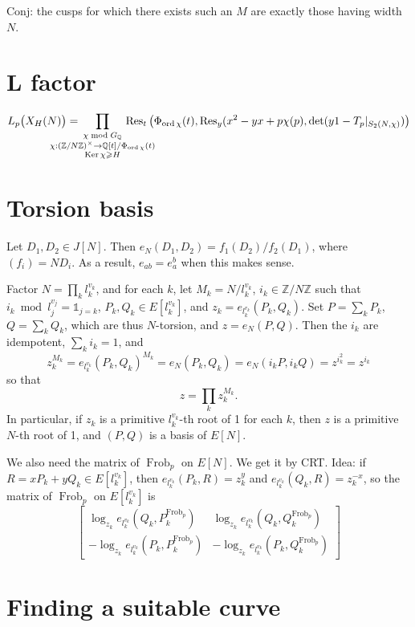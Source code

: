 \documentclass[12pt]{article}
\newcommand{\Z}{\mathbb{Z}}
\newcommand{\Q}{\mathbb{Q}}
\newcommand{\Ker}{\operatorname{Ker}}
\newcommand{\Res}{\operatorname{Res}}
\newcommand{\ord}{\operatorname{ord}}
\newcommand{\Frob}{\operatorname{Frob}}
\theoremstyle{definition}
\begin{document}
Conj: the cusps for which there exists such an $M$ are exactly those having width $N$.

\section{L factor}

\[ L_p\big(X_H(N)\big) = \hspace{-1cm} \prod_{\substack{\chi \bmod G_\Q \\ \chi : (\Z/N\Z)^\times \rightarrow \Q[t]/\Phi_{\ord \chi}(t) \\ \Ker \chi \geqslant H}} \hspace{-1cm} \Res_t\big( \Phi_{\ord \chi}(t),\Res_y(x^2-yx+p\chi(p), \det(y1-T_p \vert_{S_2(N,\chi)}) \big) \]

\section{Torsion basis}

Let $D_1, D_2 \in J[N]$. Then $e_N(D_1,D_2) = f_1(D_2)/f_2(D_1)$, where $(f_i) = N D_i$. As a result, $e_{ab} = e_a^b$ when this makes sense.

Factor $N = \prod_k l_k^{v_k}$, and for each $k$, let $M_k = N/l_k^{v_k}$, $i_k \in \Z/N\Z$ such that $i_k \bmod l_j^{v_j} = \mathds{1}_{j=k}$, $P_k, Q_k \in E[l_k^{v_k}]$, and $z_k = e_{l_k^{v_k}}(P_k,Q_k)$. Set $P = \sum_k P_k$, $Q = \sum_k Q_k$, which are thus $N$-torsion, and $z=e_N(P,Q)$. Then the $i_k$ are idempotent, $\sum_k i_k = 1$, and
\[ z_k^{M_k} = e_{l_k^{v_k}}(P_k,Q_k)^{M_k} = e_N(P_k,Q_k) = e_N(i_k P, i_k Q) = z ^{i_k^2} = z^{i_k} \]
so that
\[ z = \prod_k z_k^{M_k}. \]
In particular, if $z_k$ is a primitive $l_k^{v_k}$-th root of 1 for each $k$, then $z$ is a primitive $N$-th root of 1, and $(P,Q)$ is a basis of $E[N]$.

We also need the matrix of $\Frob_p$ on $E[N]$. We get it by CRT. Idea: if $R = x P_k + y Q_k \in E[l_k^{v_k}]$, then $e_{l_k^{v_k}}(P_k,R) = z_k^y$ and $e_{l_k^{v_k}}(Q_k,R) = z_k^{-x}$, so the matrix of $\Frob_p$ on $E[l_k^{v_k}]$ is
\[ \left[ \begin{matrix} \log_{z_k} e_{l_k^{v_k}}(Q_k,P_k^{\Frob_p}) & \log_{z_k} e_{l_k^{v_k}}(Q_k,Q_k^{\Frob_p}) \\ -\log_{z_k} e_{l_k^{v_k}}(P_k,P_k^{\Frob_p}) & -\log_{z_k} e_{l_k^{v_k}}(P_k,Q_k^{\Frob_p}) \end{matrix} \right] \]

\section{Finding a suitable curve}
\end{document}
